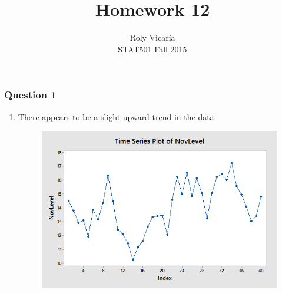 \documentclass{article}
\title{Homework 12}
\author{Roly Vicar\'ia \\ STAT501 Fall 2015}
\providecommand{\tightlist}{%
      \setlength{\itemsep}{0pt}\setlength{\parskip}{0pt}}
\begin{document}
    
    
    \maketitle
    
    

    
    \subsubsection{Question 1}\label{question-1}

\begin{enumerate}
\def\labelenumi{\alph{enumi})}
\tightlist
\item
  There appears to be a slight upward trend in the data.
  
  \begin{figure}[h!]
 \centering
 \includegraphics[scale=.45]{./images/time-series-plot_NovLevel.png}
\end{figure}

\end{enumerate}
\end{document}
